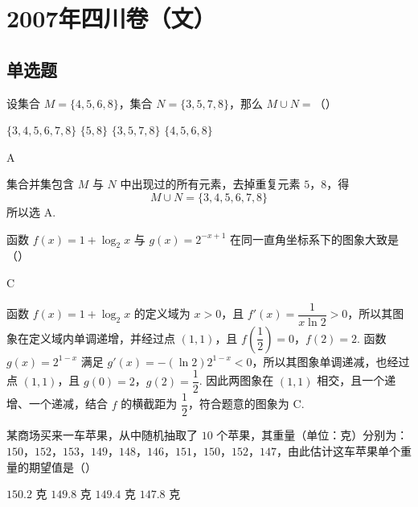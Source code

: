 \chapter{2007年四川卷（文）}
\section{单选题}
\begin{problem}
设集合 \(M = \{4, 5, 6, 8\}\)，集合 \(N = \{3, 5, 7, 8\}\)，那么 \(M \cup N =\)（\quad）

\choices
    {\( \{3, 4, 5, 6, 7, 8\} \)}
    {\( \{5, 8\} \)}
    {\( \{3, 5, 7, 8\} \)}
    {\( \{4, 5, 6, 8\} \)}
\end{problem}

\begin{answer}
A
\end{answer}

\begin{solution}
集合并集包含 \(M\) 与 \(N\) 中出现过的所有元素，去掉重复元素 \(5\)，\(8\)，得
\[
M\cup N=\{3,4,5,6,7,8\}
\]
所以选 A.
\end{solution}

\begin{problem}
函数 \( f(x) = 1 + \log_2 x \) 与 \( g(x) = 2^{-x + 1} \) 在同一直角坐标系下的图象大致是（\quad）

    {}
    {}
    {}
\end{problem}

\begin{answer}
C
\end{answer}

\begin{solution}
函数 \(f(x)=1+\log_{2}x\) 的定义域为 \(x>0\)，且 \(f'(x)=\dfrac{1}{x\ln2}>0\)，所以其图象在定义域内单调递增，并经过点 \((1,1)\)，且 \(f\left(\dfrac12\right)=0\)，\(f(2)=2\). 函数 \(g(x)=2^{1-x}\) 满足 \(g'(x)=-(\ln2)2^{1-x}<0\)，所以其图象单调递减，也经过点 \((1,1)\)，且 \(g(0)=2\)，\(g(2)=\dfrac12\). 因此两图象在 \((1,1)\) 相交，且一个递增、一个递减，结合 \(f\) 的横截距为 \(\dfrac12\)，符合题意的图象为 C.
\end{solution}

\begin{problem}
某商场买来一车苹果，从中随机抽取了 \(10\) 个苹果，其重量（单位：克）分别为：\(150\)，\(152\)，\(153\)，\(149\)，\(148\)，\(146\)，\(151\)，\(150\)，\(152\)，\(147\)，由此估计这车苹果单个重量的期望值是（\quad）

\choices
    {\(150.2\text{ 克}\)}
    {\(149.8\text{ 克}\)}
    {\(149.4\text{ 克}\)}
    {\(147.8\text{ 克}\)}
\end{problem}

